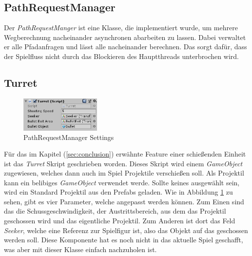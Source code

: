 \subsection*{PathRequestManager}
Der \textit{PathRequestManger} ist eine Klasse, die implementiert wurde, um mehrere Wegberechnung nacheinander asynchronen abarbeiten zu lassen. Dabei verwaltet er alle Pfadanfragen und lässt alle nacheinander berechnen. Das sorgt dafür, dass der Spielfluss nicht durch das Blockieren des Hauptthreads unterbrochen wird.
\subsection*{Turret}
\begin{figure}
    \vspace{-\intextsep}
    \hspace*{-.75\columnsep}
    \includegraphics[width=4cm]{assets/aStarTurretSettings}
    \caption{PathRequestManager Settings}
    \label{fig:aStarTurretSettings}
\end{figure}
Für das im Kapitel  (\ref{sec:conclusion}) erwähnte Feature einer schießenden Einheit ist das \textit{Turret} Skript geschrieben worden. Dieses Skript wird einem \textit{GameObject} zugewiesen, welches dann auch im Spiel Projektile verschie\ss en soll. Als Projektil kann ein belibiges \textit{GameObject} verwendet werde. Sollte keines ausgewählt sein, wird ein Standard Projektil aus den Prefabs geladen. Wie in Abbildung \ref{fig:aStarTurretSettings} zu sehen, gibt es vier Parameter, welche angepasst werden können. Zum Einen sind das die Schussgeschwindigkeit, der Austrittsbereich, aus dem das Projektil geschossen wird und das eigentliche Projektil. Zum Anderen ist dort das Feld \textit{Seeker}, welche eine Referenz zur Spielfigur ist, also das Objekt auf das geschossen werden soll. Diese Komponente hat es noch nicht in das aktuelle Spiel geschafft, was aber mit dieser Klasse einfach nachzuholen ist.
